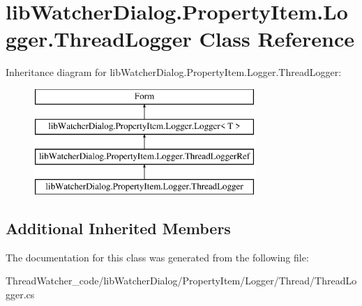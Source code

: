 \hypertarget{classlib_watcher_dialog_1_1_property_item_1_1_logger_1_1_thread_logger}{\section{lib\+Watcher\+Dialog.\+Property\+Item.\+Logger.\+Thread\+Logger Class Reference}
\label{classlib_watcher_dialog_1_1_property_item_1_1_logger_1_1_thread_logger}
}
Inheritance diagram for lib\+Watcher\+Dialog.\+Property\+Item.\+Logger.\+Thread\+Logger\+:\begin{figure}[H]
\begin{center}
\leavevmode
\includegraphics[height=4.000000cm]{classlib_watcher_dialog_1_1_property_item_1_1_logger_1_1_thread_logger}
\end{center}
\end{figure}
\subsection*{Additional Inherited Members}


The documentation for this class was generated from the following file\+:\begin{DoxyCompactItemize}
\item 
Thread\+Watcher\+\_\+code/lib\+Watcher\+Dialog/\+Property\+Item/\+Logger/\+Thread/Thread\+Logger.\+cs\end{DoxyCompactItemize}
